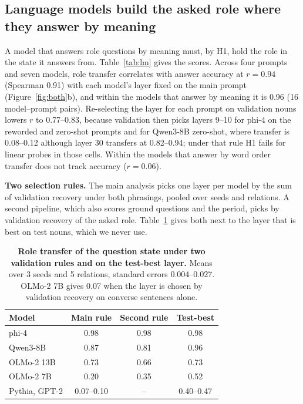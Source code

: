 \subsection{Language models build the asked role where they answer by meaning}
\label{app:behavior}

A model that answers role questions by meaning must, by H1, hold the role in the state it answers from. Table~\ref{tab:lm} gives the scores. Across four prompts and seven models, role transfer correlates with answer accuracy at $r = 0.94$ (Spearman 0.91) with each model's layer fixed on the main prompt (Figure~\ref{fig:both}b), and within the models that answer by meaning it is 0.96 (16 model--prompt pairs). Re-selecting the layer for each prompt on validation nouns lowers $r$ to 0.77--0.83, because validation then picks layers 9--10 for phi-4 on the reworded and zero-shot prompts and for Qwen3-8B zero-shot, where transfer is 0.08--0.12 although layer 30 transfers at 0.82--0.94; under that rule H1 fails for linear probes in those cells. Within the models that answer by word order transfer does not track accuracy ($r = 0.06$).

\textbf{Two selection rules.} The main analysis picks one layer per model by the sum of validation recovery under both phrasings, pooled over seeds and relations. A second pipeline, which also scores ground questions and the period, picks by validation recovery of the asked role. Table~\ref{tab:lmsel} gives both next to the layer that is best on test nouns, which we never use.

\begin{table}[h]
  \caption{\textbf{Role transfer of the question state under two validation rules and on the test-best layer.} Means over 3 seeds and 5 relations, standard errors 0.004--0.027. OLMo-2 7B gives 0.07 when the layer is chosen by validation recovery on converse sentences alone.}
  \label{tab:lmsel}
  \centering\footnotesize
  \begin{tabular}{@{}lccc@{}}
    \toprule
    Model & Main rule & Second rule & Test-best \\
    \midrule
    phi-4 & 0.98 & 0.98 & 0.98 \\
    Qwen3-8B & 0.87 & 0.81 & 0.96 \\
    OLMo-2 13B & 0.73 & 0.66 & 0.73 \\
    OLMo-2 7B & 0.20 & 0.35 & 0.52 \\
    Pythia, GPT-2 & 0.07--0.10 & -- & 0.40--0.47 \\
    \bottomrule
  \end{tabular}
\end{table}

